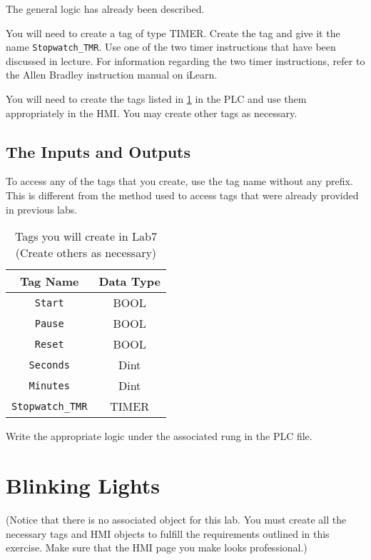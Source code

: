 The general logic has already been described.

You will need to create a tag of type TIMER. Create the tag and give it the name \verb|Stopwatch_TMR|. Use one of the two timer instructions that have been discussed in lecture. For information regarding the two timer instructions, refer to the Allen Bradley instruction manual on iLearn.

You will need to create the tags listed in \tableautorefname \ref{Table:Lab7_1Tags} in the PLC and use them appropriately in the HMI. You may create other tags as necessary.


\subsection{The Inputs and Outputs}

To access any of the tags that you create, use the tag name without any prefix. This is different from the method used to access tags that were already provided in previous labs.

\begin{table}[h]
\centering
\caption{Tags you will create in Lab7\\ (Create others as necessary)}
\label{Table:Lab7_1Tags}
\begin{tabular}{c c}
\toprule
Tag Name & Data Type\\
\midrule
\verb|Start| & BOOL \\
\verb|Pause| & BOOL\\
\verb|Reset| & BOOL\\
\verb|Seconds| & Dint\\
\verb|Minutes| & Dint\\
\verb|Stopwatch_TMR| & TIMER\\
\bottomrule
\end{tabular}
\end{table}

Write the appropriate logic under the associated rung in the PLC file.

\TASignatureSlot



\section{Blinking Lights}
(Notice that there is no associated object for this lab. You must create all the necessary tags and HMI objects to fulfill the requirements outlined in this exercise. Make sure that the HMI page you make looks professional.)
\\

